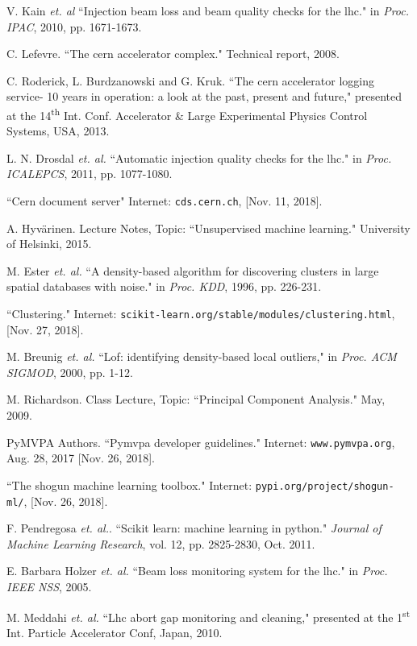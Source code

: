 \documentclass[12pt, twoside]{report}
\begin{document}
	\begin{thebibliography}{12}
		V. Kain \textit{et. al} ``Injection beam loss and beam quality checks for the lhc." in \textit{Proc. IPAC}, 2010, pp. 1671-1673.
		
		C. Lefevre. ``The cern accelerator complex." Technical report, 2008.
		
		C. Roderick, L. Burdzanowski and G. Kruk. ``The cern accelerator logging service- 10 years in operation: a look at the past, present and future," presented at the 14\textsuperscript{th} Int. Conf. Accelerator \& Large Experimental Physics Control Systems, USA, 2013.
		
		L. N. Drosdal \textit{et. al.} ``Automatic injection quality checks for the lhc." in \textit{Proc. ICALEPCS}, 2011, pp. 1077-1080.
		
		``Cern document server" Internet: \texttt{cds.cern.ch}, [Nov. 11, 2018].
		
		A. Hyv{\"a}rinen. Lecture Notes, Topic: ``Unsupervised machine learning." University of Helsinki, 2015.
		
		
		M. Ester \textit{et. al.} ``A density-based algorithm for discovering clusters in large spatial databases with noise." in \textit{Proc. KDD}, 1996, pp. 226-231.
		
		``Clustering." Internet: \texttt{scikit-learn.org/stable/modules/clustering.html}, [Nov. 27, 2018].
		
		M. Breunig \textit{et. al.} ``Lof: identifying density-based local outliers," in \textit{Proc. ACM SIGMOD}, 2000, pp. 1-12.
		
		M. Richardson. Class Lecture, Topic: ``Principal Component Analysis." May, 2009.
		
		PyMVPA Authors. ``Pymvpa developer guidelines." Internet: \texttt{www.pymvpa.org}, Aug. 28, 2017 [Nov. 26, 2018].
		
		``The shogun machine learning toolbox." Internet: \texttt{pypi.org/project/shogun-ml/}, [Nov. 26, 2018].
		
		F. Pendregosa \textit{et. al.}. ``Scikit learn: machine learning in python." \textit{Journal of Machine Learning Research}, vol. 12, pp. 2825-2830, Oct. 2011.
		
		E. Barbara Holzer \textit{et. al.} ``Beam loss monitoring system for the lhc." in \textit{Proc. IEEE NSS}, 2005. 
		
		M. Meddahi \textit{et. al.} ``Lhc abort gap monitoring and cleaning," presented at the 1\textsuperscript{st} Int. Particle Accelerator Conf, Japan, 2010.   
	\end{thebibliography}
\end{document}
